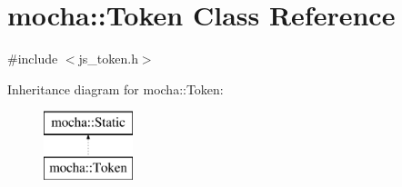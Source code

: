 \hypertarget{classmocha_1_1_token}{
\section{mocha::Token Class Reference}
\label{classmocha_1_1_token}
}


{\ttfamily \#include $<$js\_\-token.h$>$}

Inheritance diagram for mocha::Token:\begin{figure}[H]
\begin{center}
\leavevmode
\includegraphics[height=2.000000cm]{classmocha_1_1_token}
\end{center}
\end{figure}
